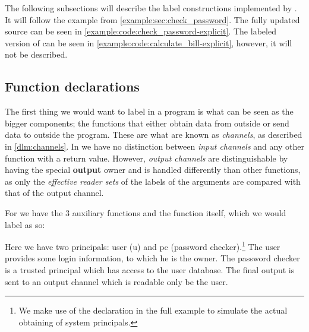The following subsections will describe the label constructions implemented by \thelang.
It will follow the  example from \cref{example:sec:check_password}.
The fully updated source can be seen in \cref{example:code:check_password-explicit}.
The labeled version of  can be seen in \cref{example:code:calculate_bill-explicit}, however, it will not be described.





\subsection{Function declarations}
The first thing we would want to label in a program is what can be seen as the bigger components; the functions that either obtain data from outside or send data to outside the program.
These are what are known as \emph{channels}, as described in \cref{dlm:channels}.
In \thelang{} we have no distinction between \emph{input channels} and any other function with a return value.
However, \emph{output channels} are distinguishable by having the special \textbf{output} owner and is handled differently than other functions, as only the \emph{effective reader sets} of the labels of the arguments are compared with that of the output channel.

For  we have the 3 auxiliary functions and the  function itself, which we would label as so:\\
\begin{minipage}{\linewidth}

\end{minipage}

Here we have two principals: user (u) and pc (password checker).\footnote{We make use of the  declaration in the full example to simulate the actual obtaining of system principals.}
The user provides some login information, to which he is the owner.
The password checker is a trusted principal which has access to the user database.
The final output is sent to an output channel which is readable only be the user.

